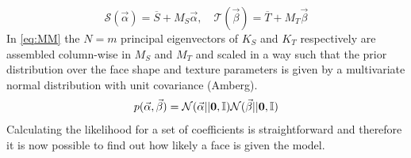 \begin{equation}
\label{eq:MM}
\mathcal{S}(\vec\alpha)=\overline{S}+M_{S}\vec\alpha, \quad \mathcal{T}(\vec\beta)=\overline{T}+M_{T}\vec\beta
\end{equation}
In \eqref{eq:MM} the $N=m$ principal eigenvectors of $K_{S}$ and $K_{T}$ respectively are assembled column-wise in $M_{S}$ and $M_{T}$ and scaled in a way such that the prior distribution over the face shape and texture parameters is given by a multivariate normal distribution with unit covariance (Amberg).
\begin{equation}
    p(\vec\alpha, \vec\beta) = \mathcal{N}(\vec\alpha\vert|\textbf{0}, \mathbb{I})\mathcal{N}(\vec\beta\vert|\textbf{0}, \mathbb{I})
\end{equation}
Calculating the likelihood for a set of coefficients is straightforward and therefore it is now possible to find out how likely a face is given the model. 

